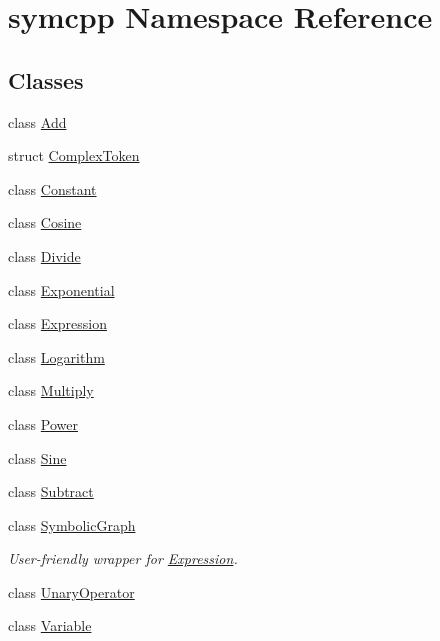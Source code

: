 \hypertarget{namespacesymcpp}{}\section{symcpp Namespace Reference}
\label{namespacesymcpp}
\subsection*{Classes}
\begin{DoxyCompactItemize}
\item 
class \hyperlink{classsymcpp_1_1Add}{Add}
\item 
struct \hyperlink{structsymcpp_1_1ComplexToken}{Complex\+Token}
\item 
class \hyperlink{classsymcpp_1_1Constant}{Constant}
\item 
class \hyperlink{classsymcpp_1_1Cosine}{Cosine}
\item 
class \hyperlink{classsymcpp_1_1Divide}{Divide}
\item 
class \hyperlink{classsymcpp_1_1Exponential}{Exponential}
\item 
class \hyperlink{classsymcpp_1_1Expression}{Expression}
\item 
class \hyperlink{classsymcpp_1_1Logarithm}{Logarithm}
\item 
class \hyperlink{classsymcpp_1_1Multiply}{Multiply}
\item 
class \hyperlink{classsymcpp_1_1Power}{Power}
\item 
class \hyperlink{classsymcpp_1_1Sine}{Sine}
\item 
class \hyperlink{classsymcpp_1_1Subtract}{Subtract}
\item 
class \hyperlink{classsymcpp_1_1SymbolicGraph}{Symbolic\+Graph}
\begin{DoxyCompactList}\small\item\em User-\/friendly wrapper for \hyperlink{classsymcpp_1_1Expression}{Expression}. \end{DoxyCompactList}\item 
class \hyperlink{classsymcpp_1_1UnaryOperator}{Unary\+Operator}
\item 
class \hyperlink{classsymcpp_1_1Variable}{Variable}
\end{DoxyCompactItemize}
